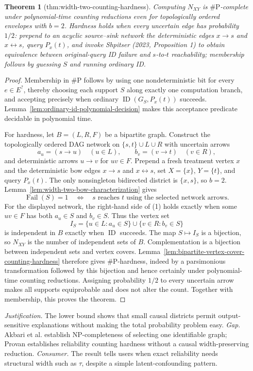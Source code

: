 \documentclass{article}
\newtheorem{theorem}{Theorem}
\begin{document}
\begin{theorem}[thm:width-two-counting-hardness]\label{thm:width-two-counting-hardness}
Computing \(N_{XY}\) is \(\#\mathrm{P}\)-complete under polynomial-time counting reductions even for topologically ordered envelopes with \(b=2\). Hardness holds when every uncertain edge has probability \(1/2\): prepend to an acyclic source--sink network the deterministic edges \(x\to s\) and \(x\leftrightarrow s\), query \(P_x(t)\), and invoke Shpitser (2023, Proposition 1) to obtain equivalence between original-query ID failure and \(s\)-to-\(t\) reachability; membership follows by guessing \(S\) and running ordinary ID.
\end{theorem}
\begin{proof}
Membership in \(\#\mathrm P\) follows by using one nondeterministic bit for every \(e\in E^{?}\), thereby choosing each support \(S\) along exactly one computation branch, and accepting precisely when ordinary \(\operatorname{ID}(G_S,P_x(t))\) succeeds.  Lemma~\ref{lem:ordinary-id-polynomial-decision} makes this acceptance predicate decidable in polynomial time.

For hardness, let \(B=(L,R,F)\) be a bipartite graph.  Construct the topologically ordered DAG network on \(\{s,t\}\cup L\cup R\) with uncertain arrows
\[
 a_u=(s\to u)\quad(u\in L),
 \qquad b_v=(v\to t)\quad(v\in R),
\]
and deterministic arrows \(u\to v\) for \(uv\in F\).  Prepend a fresh treatment vertex \(x\) and the deterministic bow edges \(x\to s\) and \(x\leftrightarrow s\), set \(X=\{x\}\), \(Y=\{t\}\), and query \(P_x(t)\).  The only nonsingleton bidirected district is \(\{x,s\}\), so \(b=2\).  Lemma~\ref{lem:width-two-bow-characterization} gives
\[
 \operatorname{Fail}(S)=1
 \quad\Longleftrightarrow\quad
 s\text{ reaches }t\text{ using the selected network arrows}. \tag{1}
\]
For the displayed network, the right-hand side of (1) holds exactly when some \(uv\in F\) has both \(a_u\in S\) and \(b_v\in S\).  Thus the vertex set
\[
 I_S=\{u\in L:a_u\in S\}\cup\{v\in R:b_v\in S\}
\]
is independent in \(B\) exactly when \(\operatorname{ID}\) succeeds.  The map \(S\mapsto I_S\) is a bijection, so \(N_{XY}\) is the number of independent sets of \(B\).  Complementation is a bijection between independent sets and vertex covers.  Lemma~\ref{lem:bipartite-vertex-cover-counting-hardness} therefore gives \(\#\mathrm P\)-hardness, indeed by a parsimonious transformation followed by this bijection and hence certainly under polynomial-time counting reductions.  Assigning probability \(1/2\) to every uncertain arrow makes all supports equiprobable and does not alter the count.  Together with membership, this proves the theorem.
\end{proof}
\par\smallskip\noindent \textit{Justification.} The lower bound shows that small causal districts permit output-sensitive explanations without making the total probability problem easy. \textit{Gap.} Akbari et al. establish NP-completeness of selecting one identifiable graph; Provan establishes reliability counting hardness without a causal width-preserving reduction. \textit{Consumer.} The result tells users when exact reliability needs structural width such as \(\tau\), despite a simple latent-confounding pattern.
\end{document}
